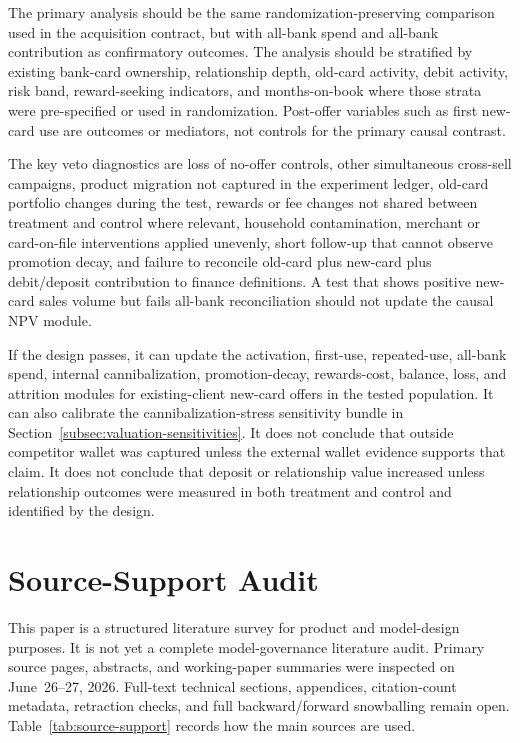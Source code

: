 \documentclass[11pt]{article}
\newcommand{\1}{\mathbf{1}}
\begin{document}
The primary analysis should be the same randomization-preserving comparison
used in the acquisition contract, but with all-bank spend and all-bank
contribution as confirmatory outcomes. The analysis should be stratified by
existing bank-card ownership, relationship depth, old-card activity, debit
activity, risk band, reward-seeking indicators, and months-on-book where those
strata were pre-specified or used in randomization. Post-offer variables such
as first new-card use are outcomes or mediators, not controls for the primary
causal contrast.

The key veto diagnostics are loss of no-offer controls, other simultaneous
cross-sell campaigns, product migration not captured in the experiment ledger,
old-card portfolio changes during the test, rewards or fee changes not shared
between treatment and control where relevant, household contamination,
merchant or card-on-file interventions applied unevenly, short follow-up that
cannot observe promotion decay, and failure to reconcile old-card plus
new-card plus debit/deposit contribution to finance definitions. A test that
shows positive new-card sales volume but fails all-bank reconciliation should
not update the causal NPV module.

If the design passes, it can update the activation, first-use, repeated-use,
all-bank spend, internal cannibalization, promotion-decay, rewards-cost,
balance, loss, and attrition modules for existing-client new-card offers in
the tested population. It can also calibrate the cannibalization-stress
sensitivity bundle in Section~\ref{subsec:valuation-sensitivities}. It does
not conclude that outside competitor wallet was captured unless the external
wallet evidence supports that claim. It does not conclude that deposit or
relationship value increased unless relationship outcomes were measured in
both treatment and control and identified by the design.

\section{Source-Support Audit}
\label{sec:audit}

This paper is a structured literature survey for product and model-design
purposes. It is not yet a complete model-governance literature audit. Primary
source pages, abstracts, and working-paper summaries were inspected on
June~26--27, 2026. Full-text technical sections, appendices, citation-count
metadata, retraction checks, and full backward/forward snowballing remain open.
Table~\ref{tab:source-support} records how the main sources are used.
\end{document}
